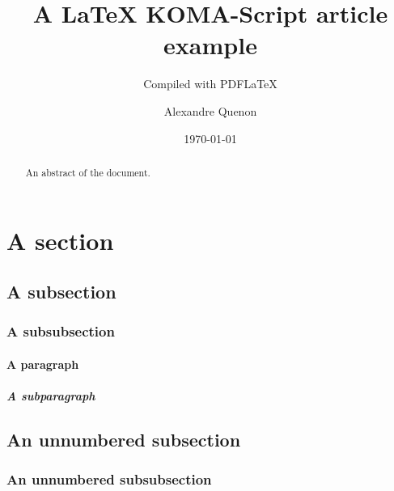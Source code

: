 \documentclass[%
	paper=A4,portrait,%
	fontsize=11pt,%
]{scrartcl}
\title{A \LaTeX{} KOMA-Script article example}
\subtitle{Compiled with PDF\LaTeX{}}
\author{Alexandre Quenon}
\date{\today}
\begin{document}

\maketitle


\begin{abstract}
	An abstract of the document.
	
	\lipsum[1-2]
\end{abstract}


\tableofcontents


\section{A section}

	\lipsum[1]
	
	
	\subsection{A subsection}
	
		\lipsum[2]
		
		
		\subsubsection{A subsubsection}
		
			\lipsum[3]
			
			
			\paragraph{A paragraph}
			
				\lipsum[4]
				
				
				\subparagraph{A subparagraph}
				
					\lipsum[5]
				
				
					
						\lipsum[6]



	\lipsum[1]
	
	
	\subsection*{An unnumbered subsection}
	
		\lipsum[2]
		
		
		\subsubsection*{An unnumbered subsubsection}
			
			\lipsum[3]



\end{document}

